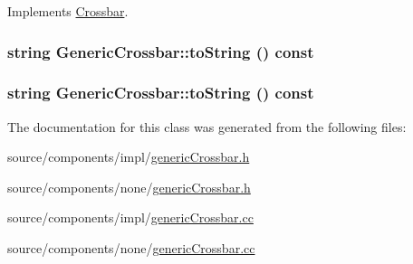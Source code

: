 Implements \hyperlink{classCrossbar_291346aae5dfeee7ef946ee3addc3877}{Crossbar}.\hypertarget{classGenericCrossbar_6794211c84eda89c8ff8e2460d5201fc}{
\subsubsection[{toString}]{\setlength{\rightskip}{0pt plus 5cm}string GenericCrossbar::toString () const}}
\label{classGenericCrossbar_6794211c84eda89c8ff8e2460d5201fc}


\hypertarget{classGenericCrossbar_6794211c84eda89c8ff8e2460d5201fc}{
\subsubsection[{toString}]{\setlength{\rightskip}{0pt plus 5cm}string GenericCrossbar::toString () const}}
\label{classGenericCrossbar_6794211c84eda89c8ff8e2460d5201fc}




The documentation for this class was generated from the following files:\begin{CompactItemize}
\item 
source/components/impl/\hyperlink{impl_2genericCrossbar_8h}{genericCrossbar.h}\item 
source/components/none/\hyperlink{none_2genericCrossbar_8h}{genericCrossbar.h}\item 
source/components/impl/\hyperlink{impl_2genericCrossbar_8cc}{genericCrossbar.cc}\item 
source/components/none/\hyperlink{none_2genericCrossbar_8cc}{genericCrossbar.cc}\end{CompactItemize}
